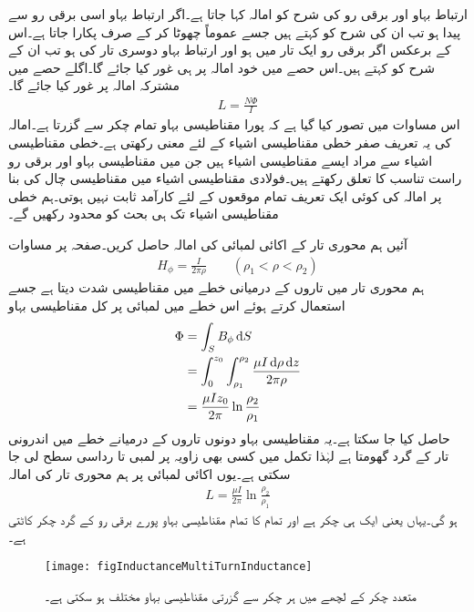 ارتباط بہاو اور برقی رو کی شرح کو امالہ کہا جاتا ہے۔اگر ارتباط بہاو اسی برقی رو سے پیدا ہو تب ان کی شرح کو  کہتے ہیں جسے عموماً چھوٹا کر کے صرف  پکارا جاتا ہے۔اس کے برعکس اگر برقی رو ایک تار میں ہو اور ارتباط بہاو دوسری تار کی ہو تب ان کے شرح کو  کہتے ہیں۔اس حصے میں خود امالہ پر ہی غور کیا جائے گا۔اگلے حصے میں مشترکہ امالہ پر غور کیا جائے گا۔ 
\begin{align}
L=\frac{N \Phi}{I}
\end{align}
اس مساوات میں تصور کیا گیا ہے کہ پورا مقناطیسی بہاو تمام چکر سے گزرتا ہے۔امالہ کی یہ تعریف صفر خطی مقناطیسی اشیاء کے لئے معنی رکھتی ہے۔خطی مقناطیسی اشیاء سے مراد ایسے مقناطیسی اشیاء ہیں جن میں مقناطیسی بہاو اور برقی رو راست تناسب کا تعلق رکھتے ہیں۔فولادی مقناطیسی اشیاء میں مقناطیسی چال کی بنا پر امالہ کی کوئی ایک تعریف تمام موقعوں کے لئے کارآمد ثابت نہیں ہوتی۔ہم خطی مقناطیسی اشیاء تک ہی بحث کو محدود رکھیں گے۔

آئیں ہم محوری تار کے اکائی لمبائی کی امالہ حاصل کریں۔صفحہ  پر مساوات 
\begin{align*}
H_{\phi}=\frac{I}{2\pi \rho} \quad \quad (\rho_1 < \rho <\rho_2)
\end{align*}
 ہم محوری تار میں تاروں کے درمیانی خطے میں مقناطیسی شدت دیتا ہے جسے استعمال کرتے ہوئے اس خطے میں  لمبائی پر کل مقناطیسی بہاو
\begin{align*}
\Phi&=\int_S B_{\phi} \dif S\\
&=\int_0^{z_0} \int_{\rho_1}^{\rho_2}\frac{\mu I \dif \rho \dif z}{2\pi \rho}\\
&=\frac{\mu  I z_0}{2\pi} \ln \frac{\rho_2}{\rho_1}
\end{align*}
حاصل کیا جا سکتا ہے۔یہ مقناطیسی بہاو دونوں تاروں کے درمیانے خطے میں  اندرونی تار کے گرد گھومتا ہے لہٰذا تکمل میں کسی بھی زاویہ پر  لمبی  تا  رداسی سطح لی جا سکتی ہے۔یوں اکائی لمبائی پر ہم محوری تار  کی امالہ
\begin{align}\label{مساوات_امالہ_ہم_محوری_کم_تعددی_امالہ}
L=\frac{\mu  I }{2\pi} \ln \frac{\rho_2}{\rho_1}
\end{align}
ہو گی۔یہاں  یعنی ایک ہی چکر ہے اور تمام کا تمام مقناطیسی بہاو پورے برقی رو کے گرد چکر کاٹتی ہے۔
\begin{figure}
\centering
\texttt{[image: figInductanceMultiTurnInductance]}
\caption{متعدد چکر کے لچھے میں ہر چکر سے گزرتی مقناطیسی بہاو مختلف ہو سکتی ہے۔}
\label{شکل_امالہ_متعدد_چکر}
\end{figure}

